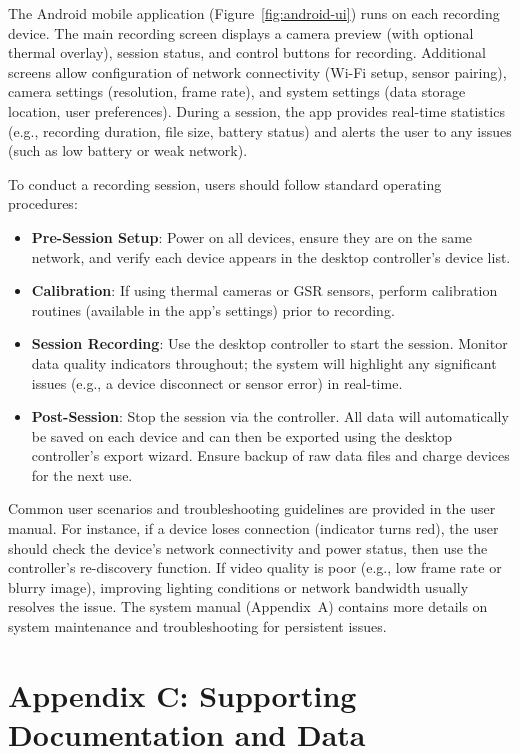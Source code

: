 \documentclass[11pt,a4paper]{report}
\begin{document}
{The Android mobile application (Figure~\ref{fig:android-ui}) runs on each recording device. The main recording screen displays a camera preview (with optional thermal overlay), session status, and control buttons for recording. Additional screens allow configuration of network connectivity (Wi-Fi setup, sensor pairing), camera settings (resolution, frame rate), and system settings (data storage location, user preferences). During a session, the app provides real-time statistics (e.g., recording duration, file size, battery status) and alerts the user to any issues (such as low battery or weak network).

To conduct a recording session, users should follow standard operating procedures:
\begin{itemize}
    \item \textbf{Pre-Session Setup}: Power on all devices, ensure they are on the same network, and verify each device appears in the desktop controller’s device list.
    \item \textbf{Calibration}: If using thermal cameras or GSR sensors, perform calibration routines (available in the app’s settings) prior to recording.
    \item \textbf{Session Recording}: Use the desktop controller to start the session. Monitor data quality indicators throughout; the system will highlight any significant issues (e.g., a device disconnect or sensor error) in real-time.
    \item \textbf{Post-Session}: Stop the session via the controller. All data will automatically be saved on each device and can then be exported using the desktop controller’s export wizard. Ensure backup of raw data files and charge devices for the next use.
\end{itemize}

Common user scenarios and troubleshooting guidelines are provided in the user manual. For instance, if a device loses connection (indicator turns red), the user should check the device’s network connectivity and power status, then use the controller’s re-discovery function. If video quality is poor (e.g., low frame rate or blurry image), improving lighting conditions or network bandwidth usually resolves the issue. The system manual (Appendix~A) contains more details on system maintenance and troubleshooting for persistent issues.

\chapter*{Appendix C: Supporting Documentation and Data}

}
\end{document}
